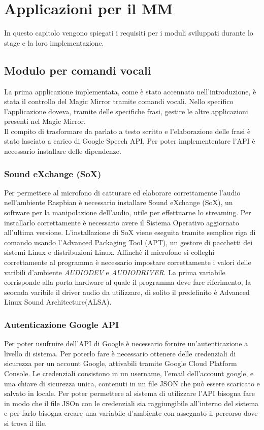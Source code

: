 \chapter{Applicazioni per il MM}
In questo capitolo vengono spiegati i requisiti per i moduli sviluppati durante lo stage e la loro implementazione.

\section{Modulo per comandi vocali}
La prima applicazione implementata, come è stato accennato nell'introduzione, è
stata il controllo del Magic Mirror tramite comandi vocali.
Nello specifico l'applicazione doveva, tramite delle specifiche frasi,
gestire le altre applicazioni presenti nel Magic Mirror.\\
Il compito di trasformare da parlato a testo scritto e l'elaborazione delle frasi è stato
lasciato a carico di Google Speech API.
Per poter implemententare l'API è necessario installare delle dipendenze.

\subsection{Sound eXchange (SoX)}
Per permettere al microfono di catturare ed elaborare correttamente l'audio nell'ambiente
Raspbian è necessario installare Sound eXchange (SoX), un software per la manipolazione
dell'audio, utile per effettuarne lo streaming.
Per installarlo correttamente è necessario avere il Sistema Operativo aggiornato all'ultima versione.
L'installazione di SoX viene eseguita tramite semplice riga di comando usando l'Advanced Packaging Tool (APT),
un gestore di pacchetti dei sistemi Linux e distribuzioni Linux.
Affinchè il microfono si colleghi correttamente al programma è necessario impostare correttamente
i valori delle varibili d'ambiente \textit{AUDIODEV} e \textit{AUDIODRIVER}.
La prima variabile corrisponde alla porta hardware al quale il programma deve fare riferimento,
la seocnda varibile il driver audio da utilizzare, di solito il predefinito è Advanced Linux Sound Architecture(ALSA).

\subsection{Autenticazione Google API}
Per poter usufruire dell'API di Google è necessario fornire un'autenticazione a livello
di sistema.
Per poterlo fare è necessario ottenere delle credenziali di sicurezza per un account Google,
attivabili tramite Google Cloud Platform Console.
Le credenziali consistono in un username, l'email dell'account google, e una chiave di sicurezza unica,
 contenuti in un file JSON che può essere scaricato e salvato in locale.
Per poter permettere al sistema di utilizzare l'API bisogna fare in modo che il file JSOn con le credenziali sia
raggiungibile all'interno del sistema e per farlo bisogna creare una variabile d'ambiente con assegnato il percorso
dove si trova il file.


